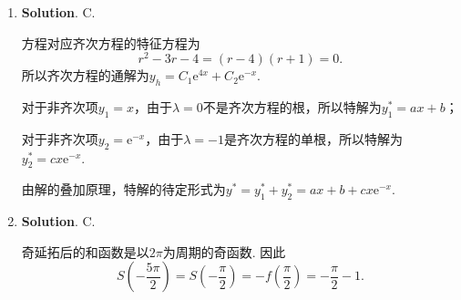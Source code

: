 \documentclass[../main.tex]{subfiles}
\begin{document}
\begin{enumerate}
          若$\sum(-1)^na_n$绝对收敛，则$S_{2N}$和$T_{2N}$都收敛，所以$\sum a_{2n}$收敛.

          对于C选项，令$a_n=\frac{1}{n^2}$，则$\sum a_n$收敛，且$\sum(-1)^na_n=\sum \frac{(-1)^n}{n^2}$绝对收敛.

          对于D选项，令$a_n=\begin{cases}
                  1,             & n=2k,  \\
                  \frac{1}{n^2}, & n=2k-1
              \end{cases}$，则$\sum a_n$发散，但当$n$充分大且为奇数时，$a_n<\frac{1}{n}$.

    \item \textbf{Solution}. C.

          方程对应齐次方程的特征方程为
          \[
              r^2-3r-4=(r-4)(r+1)=0.
          \]
          所以齐次方程的通解为$y_h=C_1\mathrm{e}^{4x}+C_2\mathrm{e}^{-x}$.

          对于非齐次项$y_1=x$，由于$\lambda=0$不是齐次方程的根，所以特解为$y_1^*=ax+b$；

          对于非齐次项$y_2=\mathrm{e}^{-x}$，由于$\lambda=-1$是齐次方程的单根，所以特解为$y_2^*=cx\mathrm{e}^{-x}$.

          由解的叠加原理，特解的待定形式为$y^*=y_1^*+y_2^*=ax+b+cx\mathrm{e}^{-x}$.

    \item \textbf{Solution}. C.

          奇延拓后的和函数是以$2\pi$为周期的奇函数. 因此
          \[
              S\left(-\frac{5\pi}{2}\right)=S\left(-\frac{\pi}{2}\right)
              =-f\left(\frac{\pi}{2}\right)
              =-\frac{\pi}{2}-1.
          \]

\end{enumerate}
\end{document}
